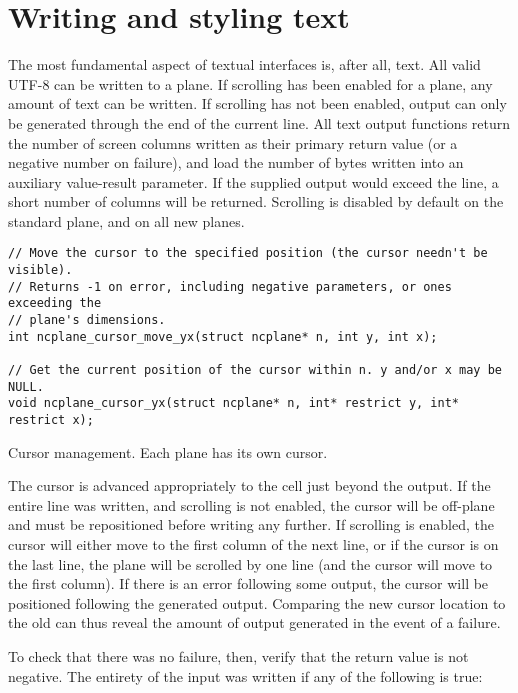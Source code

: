 \section{Writing and styling text}
\label{sec:output}
The most fundamental aspect of textual interfaces is, after all, text. All
valid UTF-8 can be written to a plane. If scrolling has been enabled for a
plane, any amount of text can be written. If scrolling has not been enabled,
output can only be generated through the end of the current line. All text
output functions return the number of screen columns written as their primary
return value (or a negative number on failure), and load the number of bytes
written into an auxiliary value-result parameter. If the supplied output would
exceed the line, a short number of columns will be returned. Scrolling is
disabled by default on the standard plane, and on all new planes.

\begin{listing}[!htbp]
\begin{verbatim}
// Move the cursor to the specified position (the cursor needn't be visible).
// Returns -1 on error, including negative parameters, or ones exceeding the
// plane's dimensions.
int ncplane_cursor_move_yx(struct ncplane* n, int y, int x);

// Get the current position of the cursor within n. y and/or x may be NULL.
void ncplane_cursor_yx(struct ncplane* n, int* restrict y, int* restrict x);
\end{verbatim}
\caption{Cursor management. Each plane has its own cursor.}
\label{list:cursor}
\end{listing}

The cursor is advanced appropriately to the cell just beyond the output. If the
entire line was written, and scrolling is not enabled, the cursor will be
off-plane and must be repositioned before writing any further. If scrolling is
enabled, the cursor will either move to the first column of the next line, or
if the cursor is on the last line, the plane will be scrolled by one line (and
the cursor will move to the first column). If there is an error following some
output, the cursor will be positioned following the generated output. Comparing
the new cursor location to the old can thus reveal the amount of output generated
in the event of a failure.

To check that there was no failure, then, verify that the return value is not
negative. The entirety of the input was written if any of the following is
true:

